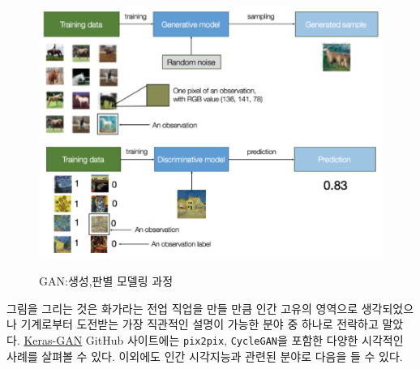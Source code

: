 \documentclass[smallextended]{svjour3}       %
\begin{document}
\begin{figure}

{\centering \includegraphics[width=0.49\linewidth]{fig/generative-model} \includegraphics[width=0.49\linewidth]{fig/discriminative-model} 

}

\caption{GAN:생성,판별 모델링 과정}\label{fig:unnamed-chunk-2}
\end{figure}

그림을 그리는 것은 화가라는 전업 직업을 만들 만큼 인간 고유의 영역으로
생각되었으나 기계로부터 도전받는 가장 직관적인 설명이 가능한 분야 중
하나로 전락하고 말았다.
\href{https://github.com/eriklindernoren/Keras-GAN}{Keras-GAN} GitHub
사이트에는 \texttt{pix2pix}, \texttt{CycleGAN}을 포함한 다양한 시각적인
사례를 살펴볼 수 있다. 이외에도 인간 시각지능과 관련된 분야로 다음을 들
수 있다.
\end{document}
